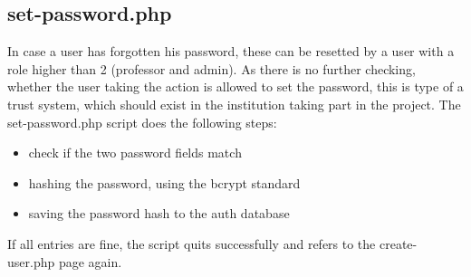 \subsection{set-password.php}
In case a user has forgotten his password, these can be resetted by a user with a role higher than 2 (professor and admin). As there is no further checking, whether the user taking the action is 
allowed to set the password, this is type of a trust system, which should exist in the institution taking part in the project.
The set-password.php script does the following steps:
\begin{itemize}
\item check if the two password fields match
\item hashing the password, using the bcrypt standard
\item saving the password hash to the auth database
\end{itemize}
If all entries are fine, the script quits successfully and refers to the create-user.php page again.

